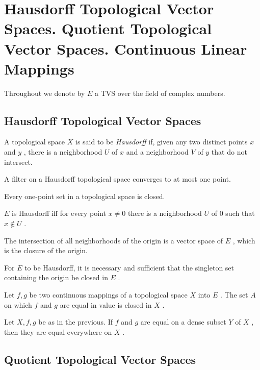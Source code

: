 \section{Hausdorff Topological Vector Spaces. Quotient Topological Vector Spaces. Continuous Linear Mappings}

Throughout we denote by $ E $ a TVS over the field of complex numbers.

\subsection{Hausdorff Topological Vector Spaces}

\indent A topological space $ X $ is said to be \textit{Hausdorff} if, given any two distinct points $ x $ and $ y $ , there is a neighborhood $ U $ of $ x $ and a neighborhood $ V $ of $ y $ that do not intersect.

\begin{thm}
	A filter on a Hausdorff topological space converges to at most one point.
\end{thm}

\begin{cor}
	Every one-point set in a topological space is closed.
\end{cor}

\begin{prop}
	$ E $ is Hausdorff iff for every point $ x \neq 0 $ there is a neighborhood $ U $ of 0 such that $ x \notin U $ .
\end{prop}

\begin{prop}
	The intersection of all neighborhoods of the origin is a vector space of $ E $ , which is the closure of the origin.
\end{prop}

\begin{cor}
	For $ E $ to be Hausdorff, it is necessary and sufficient that the singleton set containing the origin be closed in $ E $ .
\end{cor}

\begin{prop}
	Let $ f,g $ be two continuous mappings of a topological space $ X $ into $ E $ . The set $ A $ on which $ f $ and $ g $ are equal in value is closed in $ X $ .
\end{prop}

\begin{prop}
	Let $ X, f, g $ be as in the previous. If $ f $ and $ g $ are equal on a dense subset $ Y $ of $ X $ , then they are equal everywhere on $ X $ .
\end{prop}

\subsection{Quotient Topological Vector Spaces}
